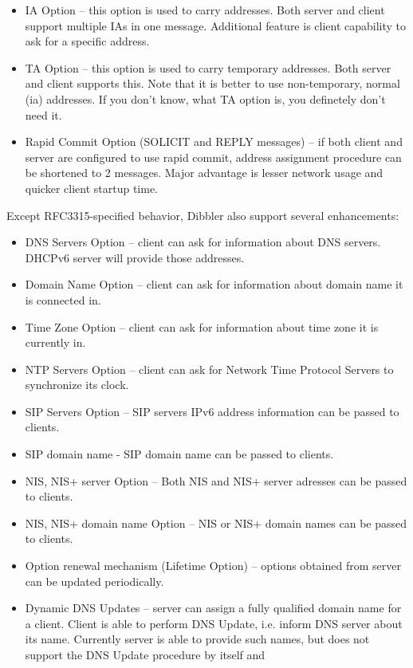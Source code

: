 \begin{itemize}
{  client side support will be available in future releases.}.
\item IA Option -- this option is used to carry addresses. Both server
  and client support multiple IAs in one message. Additional feature
  is client capability to ask for a specific address.
\item TA Option -- this option is used to carry temporary
  addresses. Both server and client supports this. Note that it is
  better to use non-temporary, normal (ia) addresses. If you don't
  know, what TA option is, you definetely don't need it.
\item Rapid Commit Option (SOLICIT and REPLY messages) -- if both
  client and server are configured to use rapid commit, address
  assignment procedure can be shortened to 2 messages. Major
  advantage is lesser network usage and quicker client startup time.
\end{itemize}

Except RFC3315-specified behavior, Dibbler also support several enhancements:

\begin{itemize}
\item DNS Servers Option -- client can ask for information about DNS
  servers. DHCPv6 server will provide those addresses.
\item Domain Name Option -- client can ask for information about
  domain name it is connected in.
\item Time Zone Option -- client can ask for information about 
time zone it is currently in.
\item NTP Servers Option -- client can ask for Network Time Protocol
  Servers to synchronize its clock.
\item SIP Servers Option -- SIP servers IPv6 address information can
  be passed to clients.
\item SIP domain name - SIP domain name can be passed to clients.
\item NIS, NIS+ server Option -- Both NIS and NIS+ server adresses
  can be passed to clients.
\item NIS, NIS+ domain name Option -- NIS or NIS+ domain names can be
  passed to clients.
\item Option renewal mechanism (Lifetime Option) -- options obtained
  from server can be updated periodically.
\item Dynamic DNS Updates -- server can assign a fully qualified
  domain name for a client. Client is able to perform DNS Update,
  i.e. inform DNS server about its name. Currently server is able to
  provide such names, but does not support the DNS Update procedure by
  itself and 
\end{itemize}

